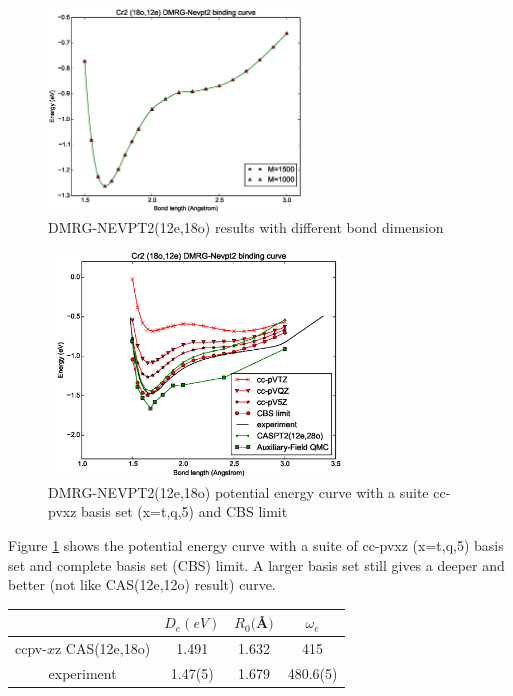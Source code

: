 \begin{figure}
\includegraphics[width=0.6\textwidth]{application/M1000-1500.eps}
  \caption{DMRG-NEVPT2(12e,18o) results with different bond dimension}

\end{figure}

\begin{figure}\label{fig:5qt_fitting}
  \includegraphics[width=8cm,height=6cm]{application/5qt-fitting.eps}
  \caption{DMRG-NEVPT2(12e,18o) potential energy curve with a suite cc-pvxz basis set (x=t,q,5) and CBS limit}
\end{figure}

Figure \ref{fig:5qt_fitting} shows the potential energy curve with a suite of cc-pvxz (x=t,q,5) basis set and complete basis set (CBS) limit. A larger basis set still gives a deeper and better (not like CAS(12e,12o) result) curve. 


\begin{table}
  \begin{tabular}{cccc}
  \toprule
      & $D_e(eV)$ & $R_0($\AA$)$ & $\omega_e$ \\
  \midrule
    ccpv-$x$z CAS(12e,18o) & 1.491 & 1.632 & 415 \\ 
  \midrule
  experiment & 1.47(5) & 1.679 & 480.6(5) \\
  \bottomrule
  \end{tabular}
\end{table}


